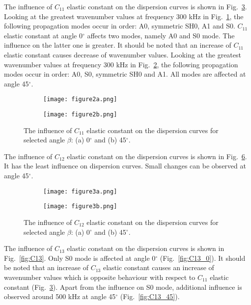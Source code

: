 \documentclass[preprint,12pt]{elsarticle}
\begin{document}
The influence of \(C_{11}\) elastic constant on the dispersion curves is shown in Fig.~\ref{fig:C11}. 
Looking at the greatest wavenumber values at frequency 300 kHz in Fig.~\ref{fig:C11_0}, the following propagation modes occur in order: A0, symmetric SH0, A1 and S0. 
\(C_{11}\) elastic constant at angle 0\(^{\circ}\) affects two modes, namely A0 and S0 mode. 
The influence on the latter one is greater.
It should be noted that an increase of  \(C_{11}\) elastic constant causes decrease of wavenumber values.
 Looking at the greatest wavenumber values at frequency 300 kHz in Fig.~\ref{fig:C11_45}, the following propagation modes occur in order: A0, S0, symmetric SH0 and A1. 
 All modes are affected at angle 45\(^{\circ}\).
 
 \begin{figure} [h!]
 	\centering
 	\begin{subfigure}[b]{0.47\textwidth}
 		\texttt{[image: figure2a.png]}
 		\caption{}
 		\label{fig:C11_0}
 	\end{subfigure}
 	\hfill
 	\begin{subfigure}[b]{0.47\textwidth}
 		\texttt{[image: figure2b.png]}
 		\caption{}
 		\label{fig:C11_45}
 	\end{subfigure}
 	\caption{The influence of \(C_{11}\) elastic constant on the dispersion curves for selected angle \(\beta\): (a) 0\(^{\circ}\) and (b) 45\(^{\circ}\).} 
 	\label{fig:C11}
 \end{figure}

 The influence of \(C_{12}\) elastic constant on the dispersion curves is shown in Fig.~\ref{fig:C12}.
 It has the least influence on dispersion curves.
 Small changes can be observed at angle 45\(^{\circ}\).

\begin{figure} [h!]
	\centering
	\begin{subfigure}[b]{0.47\textwidth}
		\centering
		\texttt{[image: figure3a.png]}
		\caption{}
		\label{fig:C12_0}
	\end{subfigure}
	\hfill
	\begin{subfigure}[b]{0.47\textwidth}
		\centering
		\texttt{[image: figure3b.png]}
		\caption{}
		\label{fig:C12_45}
	\end{subfigure}
 	\caption{The influence of \(C_{12}\) elastic constant on the dispersion curves for selected angle \(\beta\): (a) 0\(^{\circ}\) and (b) 45\(^{\circ}\).} 
	\label{fig:C12}
\end{figure}

 The influence of \(C_{13}\) elastic constant on the dispersion curves is shown in Fig.~\ref{fig:C13}.
 Only S0 mode is affected at angle 0\(^{\circ}\) (Fig.~\ref{fig:C13_0}).
 It should be noted that an increase of  \(C_{13}\) elastic constant causes an increase of wavenumber values which is opposite behaviour with respect to \(C_{11}\) elastic constant (Fig.~\ref{fig:C11}).
 Apart from the influence on S0 mode, additional influence is observed around 500 kHz at angle 45\(^{\circ}\) (Fig.~\ref{fig:C13_45}).
 
\end{document}
